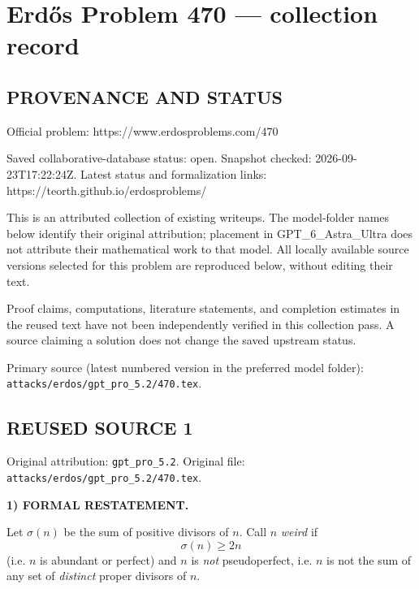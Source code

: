 \section*{Erd\H{o}s Problem 470 --- collection record}

\subsection*{PROVENANCE AND STATUS}
Official problem: https://www.erdosproblems.com/470

Saved collaborative-database status: open.
Snapshot checked: 2026-09-23T17:22:24Z.
Latest status and formalization links: https://teorth.github.io/erdosproblems/

This is an attributed collection of existing writeups. The model-folder names below identify their original attribution; placement in GPT\_6\_Astra\_Ultra does not attribute their mathematical work to that model. All locally available source versions selected for this problem are reproduced below, without editing their text.

Proof claims, computations, literature statements, and completion estimates in the reused text have not been independently verified in this collection pass. A source claiming a solution does not change the saved upstream status.

Primary source (latest numbered version in the preferred model folder): \texttt{attacks/erdos/gpt\_pro\_5.2/470.tex}.

\subsection*{REUSED SOURCE 1}
Original attribution: \texttt{gpt\_pro\_5.2}.
Original file: \texttt{attacks/erdos/gpt\_pro\_5.2/470.tex}.


\noindent\textbf{1) FORMAL RESTATEMENT.}

Let $\sigma(n)$ be the sum of positive divisors of $n$. Call $n$ \emph{weird} if
\[
\sigma(n)\ge 2n
\]
(i.e. $n$ is abundant or perfect) and $n$ is \emph{not} pseudoperfect, i.e. $n$ is not the sum of any set of \emph{distinct} proper divisors of $n$.

